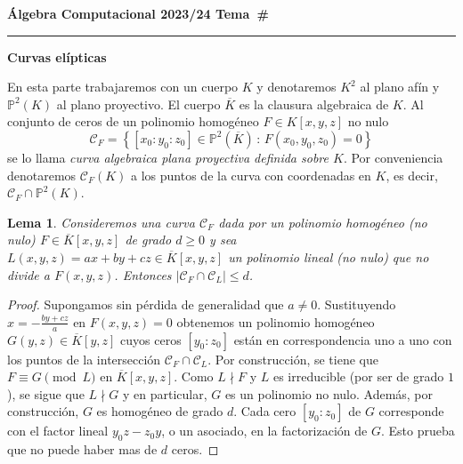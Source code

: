 \documentclass[a4paper, 11pt]{article}
\newcommand{\PP}{\mathbb{P}}
\newcounter{numerodetema}
\newcommand\tema[1]{{\eject\stepcounter{numerodetema}\bf Álgebra Computacional
2023/24 \hfill Tema~\#\arabic{numerodetema}}\par\smallskip\hrule\bigskip\par
\begin{center}{\Large\bf #1}\end{center}}
\theoremstyle{plain}
\newtheorem{lema}[teor]{Lema}
\theoremstyle{definition}
\begin{document}
\setcounter{numerodetema}{7}
\tema{Curvas elípticas}

\bigskip

En esta parte trabajaremos con un cuerpo $K$ y denotaremos $K^2$ al plano afín y
$\PP^2(K)$ al plano proyectivo. El cuerpo $\overline{K}$ es la clausura algebraica
de $K$. Al conjunto de ceros de un polinomio homogéneo
$F\in K[x,y,z]$ no nulo
\[
   \mathcal{C}_F=\left\{[x_0:y_0:z_0]\in\PP^2(\overline{K})\,:\,F(x_0,y_0,z_0)=0\right\}
\]
se lo llama \emph{curva algebraica plana proyectiva definida sobre $K$}. Por
conveniencia denotaremos $\mathcal{C}_F(K)$ a los puntos de la curva con coordenadas
en $K$, es decir, $\mathcal{C}_F\cap\PP^2(K)$.

\bigskip

\begin{lema}\label{lema-int-finita}
Consideremos una curva $\mathcal{C}_F$ dada por un polinomio homogéneo (no nulo)
$F\in\overline{K}[x,y,z]$ de grado $d\geq 0$ y sea $L(x,y,z)=ax+by+cz\in
\overline{K}[x,y,z]$ un polinomio lineal (no nulo) que no divide a $F(x,y,z)$.
Entonces
$|\mathcal{C}_F\cap\mathcal{C}_L|\leq d$.
\end{lema}
\begin{proof}
Supongamos sin pérdida de generalidad que $a\neq 0$. Sustituyendo $x=-\frac{by+cz}{a}$ en
$F(x,y,z)=0$ obtenemos un polinomio homogéneo $G(y,z)\in\overline{K}[y,z]$ cuyos ceros
$[y_0:z_0]$ están en correspondencia uno a uno con los puntos de la intersección
$\mathcal{C}_F\cap\mathcal{C}_L$. Por construcción, se tiene que $F\equiv G\pmod{L}$
en $\overline{K}[x,y,z]$. Como $L\nmid F$ y $L$ es irreducible (por ser de grado $1$),
se sigue que $L\nmid G$ y en particular, $G$ es un polinomio no nulo. Además, por
construcción, $G$ es homogéneo de grado $d$. Cada cero $[y_0:z_0]$ de $G$ corresponde
con el factor lineal $y_0z-z_0y$, o un asociado, en la factorización de $G$. Esto prueba
que no puede haber mas de $d$ ceros.
\end{proof}
\end{document}
